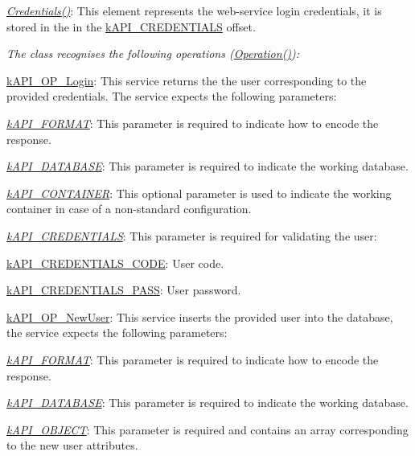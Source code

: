 {\itshape 
\begin{DoxyItemize}
\item {\itshape \hyperlink{}{Credentials()}}\-: This element represents the web-\/service login credentials, it is stored in the in the \hyperlink{}{k\-A\-P\-I\-\_\-\-C\-R\-E\-D\-E\-N\-T\-I\-A\-L\-S} offset. 
\end{DoxyItemize}}

{\itshape The class recognises the following operations (\hyperlink{}{Operation()})\-:}

{\itshape 
\begin{DoxyItemize}
\item {\ttfamily \hyperlink{}{k\-A\-P\-I\-\_\-\-O\-P\-\_\-\-Login}}\-: This service returns the the user corresponding to the provided credentials. The service expects the following parameters\-: 
\begin{DoxyItemize}
\item {\itshape \hyperlink{}{k\-A\-P\-I\-\_\-\-F\-O\-R\-M\-A\-T}}\-: This parameter is required to indicate how to encode the response. 
\item {\itshape \hyperlink{}{k\-A\-P\-I\-\_\-\-D\-A\-T\-A\-B\-A\-S\-E}}\-: This parameter is required to indicate the working database. 
\item {\itshape \hyperlink{}{k\-A\-P\-I\-\_\-\-C\-O\-N\-T\-A\-I\-N\-E\-R}}\-: This optional parameter is used to indicate the working container in case of a non-\/standard configuration. 
\item {\itshape \hyperlink{}{k\-A\-P\-I\-\_\-\-C\-R\-E\-D\-E\-N\-T\-I\-A\-L\-S}}\-: This parameter is required for validating the user\-: 
\begin{DoxyItemize}
\item {\ttfamily \hyperlink{}{k\-A\-P\-I\-\_\-\-C\-R\-E\-D\-E\-N\-T\-I\-A\-L\-S\-\_\-\-C\-O\-D\-E}}\-: User code. 
\item {\ttfamily \hyperlink{}{k\-A\-P\-I\-\_\-\-C\-R\-E\-D\-E\-N\-T\-I\-A\-L\-S\-\_\-\-P\-A\-S\-S}}\-: User password. 
\end{DoxyItemize}
\end{DoxyItemize}
\item {\ttfamily \hyperlink{}{k\-A\-P\-I\-\_\-\-O\-P\-\_\-\-New\-User}}\-: This service inserts the provided user into the database, the service expects the following parameters\-: 
\begin{DoxyItemize}
\item {\itshape \hyperlink{}{k\-A\-P\-I\-\_\-\-F\-O\-R\-M\-A\-T}}\-: This parameter is required to indicate how to encode the response. 
\item {\itshape \hyperlink{}{k\-A\-P\-I\-\_\-\-D\-A\-T\-A\-B\-A\-S\-E}}\-: This parameter is required to indicate the working database. 
\item {\itshape \hyperlink{}{k\-A\-P\-I\-\_\-\-O\-B\-J\-E\-C\-T}}\-: This parameter is required and contains an array corresponding to the new user attributes. 
\end{DoxyItemize}
\end{DoxyItemize}}

